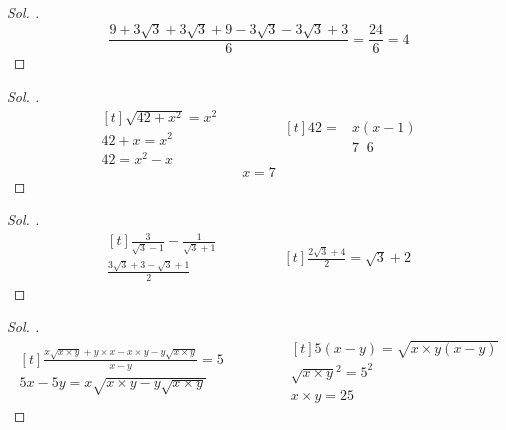\documentclass{article}
\theoremstyle{mytheoremstyle}
\theoremstyle{mytheoremstyle}
\theoremstyle{myproblemstyle}
\begin{document}
\begin{proof}[\textit{ Sol. }]
  $$ \frac{9 + 3\sqrt{3} + 3\sqrt{3} + 9 - 3\sqrt{3} - 3\sqrt{3} + 3}{6} = \frac{24}{6} = 4 $$
\end{proof}

\begin{problem}[$ \sqrt{42 + \sqrt{42 + \sqrt{42} + ...}} = ? $ (x) $ (x = \sqrt{42 + \sqrt{42 + ...}})$]
\end{problem}

\begin{proof}[\textit{ Sol. }]
  \begin{equation*}
    \begin{aligned}[t]
      \sqrt{42 + x^2} = x^2\\
      42 + x = x^2\\
      42 = x^2 - x
    \end{aligned}
    \qquad\qquad
    \begin{aligned}[t]
      42 = &x(x - 1)\\
      &7\;\;6
    \end{aligned}
  \end{equation*}
  $$ x = 7 $$
\end{proof}

\begin{problem}[$ \frac{3}{\sqrt{3} - 1} - \frac{1}{\sqrt{4 + 2\sqrt{3}}} = ? $]
\end{problem}

\begin{proof}[\textit{ Sol. }]
  \begin{equation*}
    \begin{aligned}[t]
      \frac{3}{\sqrt{3} - 1} - \frac{1}{\sqrt{3} + 1}\\
      \frac{3\sqrt{3} + 3 - \sqrt{3} + 1}{2}
    \end{aligned}
    \qquad\qquad
    \begin{aligned}[t]
      \frac{2\sqrt{3} + 4}{2} = \sqrt{3} + 2
    \end{aligned}
  \end{equation*}
\end{proof}

\begin{problem}[$ x, y \in {R+} $, $ \frac{x\sqrt{y} + y\sqrt{x}}{\sqrt{x} + \sqrt{y}} = 5 $; $ x \times y = ? $]
\end{problem}

\begin{proof}[\textit{ Sol. }]
  \begin{equation*}
    \begin{aligned}[t]
      \frac{x\sqrt{x \times y} + y \times x - x \times y - y \sqrt{x \times y}}{x - y} = 5\\
      5x - 5y = x \sqrt{x \times y - y \sqrt{x \times y}}
    \end{aligned}
    \qquad\qquad
    \begin{aligned}[t]
      5(x - y) = \sqrt{x \times y(x - y)}\\
      \sqrt{x \times y}^2 = 5^2\\
      x \times y = 25
    \end{aligned}
  \end{equation*}
\end{proof}
\end{document}
